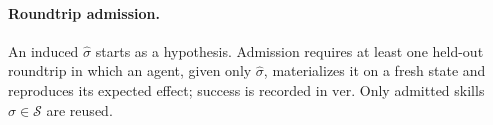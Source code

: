 \paragraph{Roundtrip admission.}
An induced $\hat{\sigma}$ starts as a hypothesis. Admission requires at least one held-out roundtrip in which an agent, given only $\hat{\sigma}$, materializes it on a fresh state and reproduces its expected effect; success is recorded in $\mathrm{ver}$. Only admitted skills $\sigma \in \mathcal{S}$ are reused.



